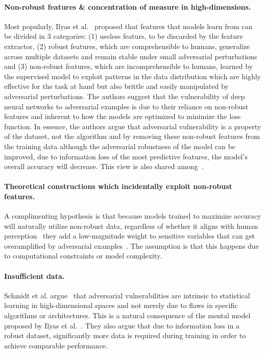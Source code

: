 \documentclass[a4paper, oneside]{discothesis}
\begin{document}
\paragraph{Non-robust features \& concentration of measure in high-dimensions.} Most popularly, Ilyas et al.\ \cite{ilyas2019adversarial} proposed that features that models learn from can be divided in 3 categories: (1) useless featurs, to be discarded by the feature extractor, (2) robust features, which are comprehensible to humans, generalize across multiple datasets and remain stable under small adversarial perturbations and (3) non-robust features, which are incomprehensible to humans, learned by the supervised model to exploit patterns in the data distribution which are highly effective for the task at hand but also brittle and easily manipulated by adversarial perturbations. The authors suggest that the vulnerability of deep neural networks to adversarial examples is due to their reliance on non-robust features and inherent to how the models are optimized to minimize the loss function. In essence, the authors argue that adversarial vulnerability is a property of the dataset, not the algorithm and by removing these non-robust features from the training data although the adversarial robustness of the model can be improved, due to information loss of the most predictive features, the model's overall accuracy will decrease. This view is also shared among~\cite{engstrom2019a, raghunathan2018certified, wong2018provable, xiao2018training, cohen2019certified, fawzi2018adversarial, mahloujifar2019curse, shafahi2018adversarial, gilmer2018adversarial, madry2017towards}.

\paragraph{Theoretical constructions which incidentally exploit non-robust features.} A complimenting hypothesis is that because models trained to maximize accuracy will naturally utilize non-robust data, regardless of whether it aligns with human perception~\cite{ilyas2019adversarial} they add a low-magnitude weight to sensitive variables that can get overamplified by adversarial examples~\cite{bubeck2019adversarial, nakkiran2019adversarial}. The assumption is that this happens due to computational constraints or model complexity.

\paragraph{Insufficient data.} Schmidt et al. argue~\cite{schmidt2018adversarially} that adversarial vulnerabilities are intrinsic to statistical learning in high-dimensional spaces and not merely due to flaws in specific algorithms or architectures. This is a natural consequence of the mental model proposed by Ilyas et al.\ \cite{ilyas2019adversarial}. They also argue that due to information loss in a robust dataset, significantly more data is required during training in order to achieve comparable performance.
\end{document}
